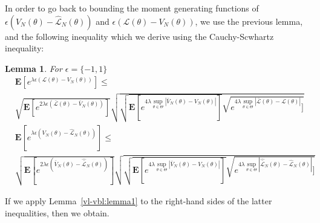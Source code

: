 \documentclass{article}
\newtheorem{lemma}[theorem]{Lemma}
\newcommand{\bE}{\mathbf{E}}
\begin{document}
In order to go back to bounding the moment generating functions of 
$\epsilon (V_N(\theta)-\hat{\mathcal{L}}_N(\theta))$ and $\epsilon (\mathcal{L}(\theta)-V_N(\theta))$, 
we use the previous lemma, and the following inequality which we derive using the Cauchy-Scwhartz inequality: %
\begin{lemma}
  \label{basic_lemma:lipschitz3.1}
  For $\epsilon=\{-1,1\}$
   \begin{align}
      & \bE[e^{\lambda \epsilon (\mathcal{L}(\theta)-V_N(\theta))}]   \le \nonumber  \\
      & \sqrt{\bE[e^{2\lambda \epsilon (\bar{\mathcal{L}}(\theta)-\bar{V}_N(\theta))}]}
     \sqrt{\sqrt{\bE[e^{4\lambda \sup_{\theta \in \Theta} |\bar{V}_N(\theta)-V_N(\theta)|}]} 
     \sqrt{e^{4\lambda \sup_{\theta \in \Theta} |\bar{\mathcal{L}}(\theta)-\mathcal{L}(\theta)|}]}}
     \label{eq:basic_lemma_lipschitz3:pf:eq0.1}  \\
        & \bE[e^{\lambda \epsilon (V_N(\theta)-\hat{\mathcal{L}}_N(\theta))}]   
      \le  \nonumber \\
      & \sqrt{\bE[e^{2\lambda \epsilon (\bar{V}_N(\theta)-\hat{\bar{\mathcal{L}}}_N(\theta))}]}
     \sqrt{\sqrt{\bE[e^{4\lambda \sup_{\theta \in \Theta} |\bar{V}_N(\theta)-V_N(\theta)|}]} \sqrt{e^{4\lambda \sup_{\theta \in \Theta} |\hat{\bar{\mathcal{L}}}_N(\theta)-\hat{\mathcal{L}}_N(\theta)|}]}}
     \label{eq:basic_lemma_lipschitz3:pf:eq0} 
    \end{align}
\end{lemma}
If we apply Lemma~\ref{vl-vbl:lemma1} %
to the right-hand sides of the latter inequalities, then we obtain.
\end{document}

